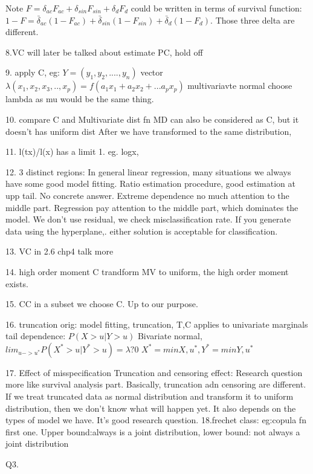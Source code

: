 \documentclass[a4paper,12pt]{texMemo}
\begin{document}
Note $F = \delta_{ac}F_{ac} + \delta_{sin}F_{sin} + \delta_{d}F_d$ could be written in terms of survival function:
$1 - F = \bar{\delta}_{ac}(1 - F_{ac}) + \bar{\delta}_{sin}(1 - F_{sin}) + \bar{\delta}_{d}(1 - F_d)$. Those three delta are different.

8.VC will later be talked about
estimate PC, hold off


9. apply C, eg:
$Y=(y_1,y_2,....,y_n)$    vector $\lambda(x_1,x_2,x_3,..,x_p)=f(a_1x_1+a_2x_2+...a_px_p)$
multivariavte normal choose lambda as mu would be the same thing.

10. compare C and Multivariate dist fn
MD can also be considered as C, but it doesn't has uniform dist
After we have transformed to the same distribution, 

11. l(tx)/l(x) has a limit 1. eg. logx, 

12. 3 distinct regions:
In general linear regression, many situations we always have some good model fitting. 
Ratio estimation procedure, good estimation at upp tail.
No concrete answer.
Extreme dependence no much attention to the middle part.
Regression pay attention to the middle part, which dominates the model. 
We don't use residual, we check misclassification rate. 
If you generate data using the hyperplane,. either solution is acceptable for classification. 

13. VC in 2.6 chp4 talk more

14. high order moment
C trandform MV to uniform, the high order moment exists.

15. CC in a subset we choose C. Up to our purpose.

16. truncation 
orig: model fitting, truncation, 
T,C applies to univariate marginals 
tail dependence: $P(X>u|Y>u)$
Bivariate normal,  $lim_{u->u^*}P(X^*>u|Y^*>u)=\lambda?0$
$X^*=min{X,u^*},Y^*=min{Y,u^*}$   

17. Effect of misspecification
Truncation and censoring effect: Research question more like survival analysis part.
Basically, truncation adn censoring are different. If we treat truncated data as normal distribution and transform it to uniform distribution, then we don't know what will happen yet. It also depends on the types of model we have. It's good research question. 
18.frechet class:
eg:copula fn 
first one. 
Upper bound:always is a joint distribution, lower bound: not always a joint distribution

Q3.
\end{document}
